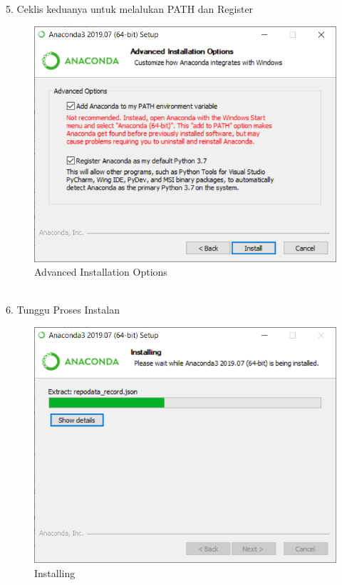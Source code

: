\documentclass[12pt, times new roman, a4paper]{article}
\begin{document}
\\
\\
\\
\\
\\
\\
\\
\\
\\
\\
5. Ceklis keduanya untuk melalukan PATH dan Register\\
\begin{figure}[h]
	\centering
		\includegraphics[scale=0.5]{Gambar/A5}
	\caption{Advanced Installation Options}
\end{figure}
\\
6. Tunggu Proses Instalan\\
\begin{figure}[h]
	\centering
		\includegraphics[scale=0.5]{Gambar/A6}
	\caption{Installing}
\end{figure}
\end{document}
